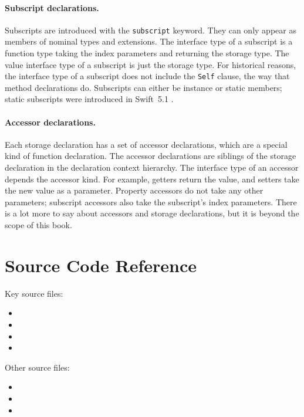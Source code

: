 \documentclass[../generics]{subfiles}
\begin{document}
\paragraph{Subscript declarations.} Subscripts are introduced with the \texttt{subscript} keyword. They can only appear as members of nominal types and extensions. The interface type of a subscript is a function type taking the index parameters and returning the storage type. The value interface type of a subscript is just the storage type. For historical reasons, the interface type of a subscript does not include the \texttt{Self} clause, the way that method declarations do. Subscripts can either be instance or static members; static subscripts were introduced in Swift~5.1 \cite{se0254}.

\paragraph{Accessor declarations.}
Each storage declaration has a set of accessor declarations, which are a special kind of function declaration. The accessor declarations are siblings of the storage declaration in the declaration context hierarchy. The interface type of an accessor depends the accessor kind. For example, getters return the value, and setters take the new value as a parameter. Property accessors do not take any other parameters; subscript accessors also take the subscript's index parameters. There is a lot more to say about accessors and storage declarations, but it is beyond the scope of this book.

\section{Source Code Reference}\label{declarationssourceref}

Key source files:
\begin{itemize}
\item {}
\item {}
\item {}
\item {}
\end{itemize}
Other source files:
\begin{itemize}
\item {}
\item {}
\item {}
\end{itemize}
\end{document}
